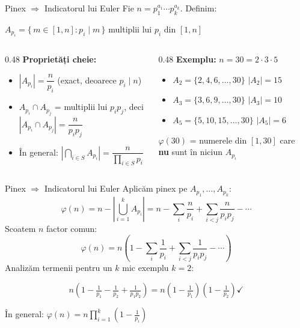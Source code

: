 \documentclass[10pt]{beamer}
\begin{document}
\begin{frame}{Pinex $\Rightarrow$ Indicatorul lui Euler}
  Fie $n = p_1^{a_1} \cdots p_k^{a_k}$. Definim:
  \begin{block}{}
    $A_{p_i} = \{\,m \in [1, n] : p_i \mid m\,\}$ \textemdash{} multiplii lui $p_i$ din $[1, n]$
  \end{block}
  \smallskip
  \begin{columns}[T]
    \begin{column}{0.48\textwidth}
      \textbf{Proprietăți cheie:}
      \begin{itemize}\itemsep2pt
        \item $|A_{p_i}| = \dfrac{n}{p_i}$ \quad (exact, deoarece $p_i \mid n$)
        \item $A_{p_i} \cap A_{p_j}$ = multiplii lui $p_i p_j$, deci $|A_{p_i} \cap A_{p_j}| = \dfrac{n}{p_i p_j}$
        \item În general: $\left|\bigcap_{i \in S} A_{p_i}\right| = \dfrac{n}{\prod_{i \in S} p_i}$
      \end{itemize}
    \end{column}
    \begin{column}{0.48\textwidth}
      \textbf{Exemplu:} $n = 30 = 2 \cdot 3 \cdot 5$
      \begin{itemize}\itemsep2pt
        \item $A_2 = \{2,4,6,\ldots,30\}$ \quad $|A_2| = 15$
        \item $A_3 = \{3,6,9,\ldots,30\}$ \quad $|A_3| = 10$
        \item $A_5 = \{5,10,15,\ldots,30\}$ \quad $|A_5| = 6$
      \end{itemize}
      \smallskip
      $\varphi(30)$ = numerele din $[1,30]$ care \textbf{nu} sunt în niciun $A_{p_i}$
    \end{column}
  \end{columns}
\end{frame}

\begin{frame}{Pinex $\Rightarrow$ Indicatorul lui Euler}
  Aplicăm pinex pe $A_{p_1}, \ldots, A_{p_k}$:
  \[
    \varphi(n) = n - \left|\bigcup_{i=1}^k A_{p_i}\right|
    = n - \sum_i \frac{n}{p_i} + \sum_{i<j} \frac{n}{p_ip_j} - \cdots
  \]
  Scoatem $n$ factor comun:
  \[
    \varphi(n) = n\!\left(1 - \sum_i \frac{1}{p_i} + \sum_{i<j} \frac{1}{p_ip_j} - \cdots\right)
  \]
  Analizăm termenii pentru un $k$ mic \textemdash{} exemplu $k=2$:
  \begin{block}{}
    \vspace{-4pt}
    \[
      n\!\left(1 - \tfrac{1}{p_1} - \tfrac{1}{p_2} + \tfrac{1}{p_1 p_2}\right)
      = n\!\left(1 - \tfrac{1}{p_1}\right)\!\left(1 - \tfrac{1}{p_2}\right) \checkmark
    \]
    \vspace{-6pt}
  \end{block}
  \vspace{-2pt}
  În general: $\displaystyle\varphi(n) = n \prod_{i=1}^k \!\left(1 - \frac{1}{p_i}\right)$
\end{frame}
\end{document}
